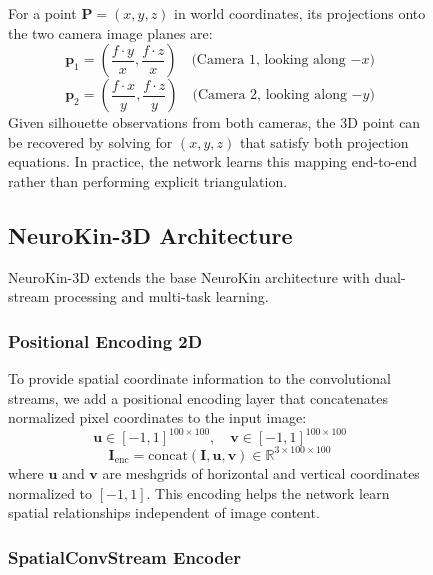 \documentclass[12pt,a4paper,oneside]{report}
\begin{document}
\begin{figure}[H]
For a point $\mathbf{P} = (x, y, z)$ in world coordinates, its projections onto the two camera image planes are:
\begin{equation}
\mathbf{p}_1 = \left( \frac{f \cdot y}{x}, \frac{f \cdot z}{x} \right) \quad \text{(Camera 1, looking along $-x$)}
\end{equation}
\begin{equation}
\mathbf{p}_2 = \left( \frac{f \cdot x}{y}, \frac{f \cdot z}{y} \right) \quad \text{(Camera 2, looking along $-y$)}
\end{equation}
Given silhouette observations from both cameras, the 3D point can be recovered by solving for $(x, y, z)$ that satisfy both projection equations. In practice, the network learns this mapping end-to-end rather than performing explicit triangulation.

\subsection{NeuroKin-3D Architecture}

NeuroKin-3D extends the base NeuroKin architecture with dual-stream processing and multi-task learning.

\subsubsection{Positional Encoding 2D}

To provide spatial coordinate information to the convolutional streams, we add a positional encoding layer that concatenates normalized pixel coordinates to the input image:
\begin{equation}
\mathbf{u} \in [-1, 1]^{100 \times 100}, \quad \mathbf{v} \in [-1, 1]^{100 \times 100}
\end{equation}
\begin{equation}
\mathbf{I}_{\text{enc}} = \text{concat}(\mathbf{I}, \mathbf{u}, \mathbf{v}) \in \mathbb{R}^{3 \times 100 \times 100}
\end{equation}
where $\mathbf{u}$ and $\mathbf{v}$ are meshgrids of horizontal and vertical coordinates normalized to $[-1, 1]$. This encoding helps the network learn spatial relationships independent of image content.

\subsubsection{SpatialConvStream Encoder}


\end{figure}
\end{document}
